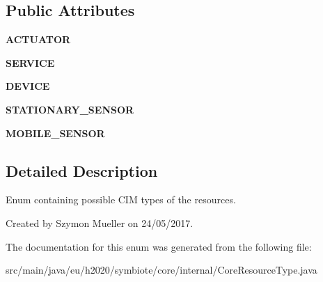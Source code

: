 \subsection*{Public Attributes}
\begin{DoxyCompactItemize}
\item 
\mbox{\label{enumeu_1_1h2020_1_1symbiote_1_1core_1_1internal_1_1CoreResourceType_a10413327c2c37e5a74eeb6d23b584492}} 
{\bfseries A\+C\+T\+U\+A\+T\+OR}
\item 
\mbox{\label{enumeu_1_1h2020_1_1symbiote_1_1core_1_1internal_1_1CoreResourceType_a0273e220ea3d1901f0cb8f7c6a65b0f7}} 
{\bfseries S\+E\+R\+V\+I\+CE}
\item 
\mbox{\label{enumeu_1_1h2020_1_1symbiote_1_1core_1_1internal_1_1CoreResourceType_abd8e783a3a0c437cd602474acb6cc93b}} 
{\bfseries D\+E\+V\+I\+CE}
\item 
\mbox{\label{enumeu_1_1h2020_1_1symbiote_1_1core_1_1internal_1_1CoreResourceType_a1cfe29bfb873b9327aa62ba092ab10e1}} 
{\bfseries S\+T\+A\+T\+I\+O\+N\+A\+R\+Y\+\_\+\+S\+E\+N\+S\+OR}
\item 
\mbox{\label{enumeu_1_1h2020_1_1symbiote_1_1core_1_1internal_1_1CoreResourceType_acbfde887bb6c14d9e6ebaab0f0154260}} 
{\bfseries M\+O\+B\+I\+L\+E\+\_\+\+S\+E\+N\+S\+OR}
\end{DoxyCompactItemize}


\subsection{Detailed Description}
Enum containing possible C\+IM types of the resources.

Created by Szymon Mueller on 24/05/2017. 

The documentation for this enum was generated from the following file\+:\begin{DoxyCompactItemize}
\item 
src/main/java/eu/h2020/symbiote/core/internal/Core\+Resource\+Type.\+java\end{DoxyCompactItemize}

